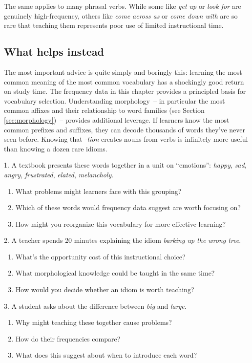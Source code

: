 The same applies to many phrasal verbs. While some like \textit{get up} or \textit{look for} are genuinely high-frequency, others like \textit{come across as} or \textit{come down with} are so rare that teaching them represents poor use of limited instructional time.

\subsection{What helps instead}

The most important advice is quite simply and boringly this: learning the most common meaning of the most common vocabulary has a shockingly good return on study time. The frequency data in this chapter provides a principled basis for vocabulary selection.
Understanding morphology~-- in particular the most common affixes and their relationship to word families (see Section \ref{sec:morphology})~-- provides additional leverage. If learners know the most common prefixes and suffixes, they can decode thousands of words they've never seen before. Knowing that \textit{-tion} creates nouns from verbs is infinitely more useful than knowing a dozen rare idioms.

\begin{tcolorbox}[title=Exercise: Avoiding Common Pitfalls, colback=white, colframe=red!75!black, fonttitle=\bfseries]
1. A textbook presents these words together in a unit on ``emotions'': \textit{happy}, \textit{sad}, \textit{angry}, \textit{frustrated}, \textit{elated}, \textit{melancholy}.
  \begin{enumerate}[nosep]
  \item What problems might learners face with this grouping?
  \item Which of these words would frequency data suggest are worth focusing on?
  \item How might you reorganize this vocabulary for more effective learning?
  \end{enumerate}

2. A teacher spends 20 minutes explaining the idiom \textit{barking up the wrong tree}.
  \begin{enumerate}[nosep]
  \item What's the opportunity cost of this instructional choice?
  \item What morphological knowledge could be taught in the same time?
  \item How would you decide whether an idiom is worth teaching?
  \end{enumerate}

3. A student asks about the difference between \textit{big} and \textit{large}.
  \begin{enumerate}[nosep]
  \item Why might teaching these together cause problems?
  \item How do their frequencies compare?
  \item What does this suggest about when to introduce each word?
  \end{enumerate}
\end{tcolorbox}

